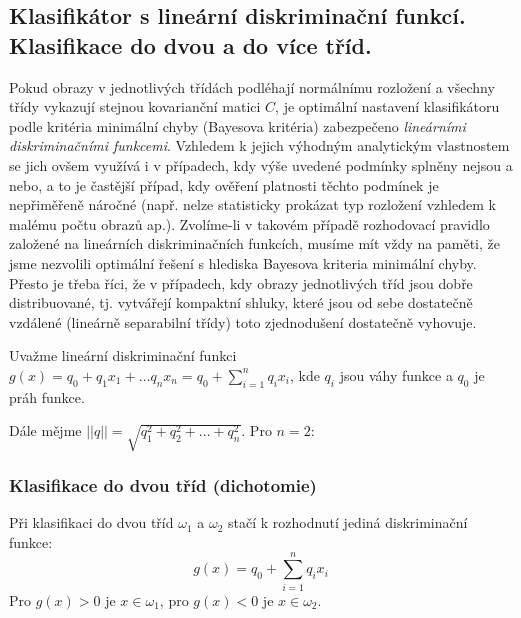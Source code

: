 \subsection{Klasifikátor s lineární diskriminační funkcí. Klasifikace do dvou a do více tříd.}
Pokud obrazy v jednotlivých třídách podléhají normálnímu rozložení a všechny třídy vykazují stejnou kovarianční matici $ C $, je optimální nastavení klasifikátoru podle kritéria minimální chyby (Bayesova kritéria) zabezpečeno \textit{lineárními diskriminačními funkcemi}. Vzhledem k jejich výhodným analytickým vlastnostem se jich ovšem využívá i v případech, kdy výše uvedené podmínky splněny nejsou a nebo, a to je častější případ, kdy ověření platnosti těchto podmínek je nepřiměřeně náročné (např. nelze statisticky prokázat typ rozložení vzhledem k malému počtu obrazů ap.). Zvolíme-li v takovém případě rozhodovací pravidlo založené na lineárních diskriminačních funkcích, musíme mít vždy na paměti, že jsme nezvolili optimální řešení s hlediska Bayesova kriteria minimální chyby. Přesto je třeba říci, že v případech, kdy obrazy jednotlivých tříd jsou dobře distribuované, tj. vytvářejí kompaktní shluky, které jsou od sebe dostatečně vzdálené (lineárně separabilní třídy) toto zjednodušení dostatečně vyhovuje.

Uvažme lineární diskriminační funkci $ g(x) = q_0 + q_1 x_1 + \dots q_n x_n = q_0 + \displaystyle{\sum_{i=1}^{n}} q_i x_i $, kde $ q_i $ jsou váhy funkce a $ q_0 $ je práh funkce.

Dále mějme $ ||q|| = \sqrt{q_1^2 + q_2^2 + \dots + q_n^2} $. Pro $ n=2 $:
\vspace{3cm}

\subsubsection*{Klasifikace do dvou tříd (dichotomie)}
Při klasifikaci do dvou tříd $ \omega_1 $ a $ \omega_2 $ stačí k rozhodnutí jediná diskriminační funkce:
\begin{equation}
g(x) = q_0 + \displaystyle{\sum_{i=1}^{n}} q_i x_i
\end{equation}
Pro $ g(x) > 0 $ je $ x \in \omega_1 $, pro $ g(x) < 0 $ je $ x \in \omega_2 $.

